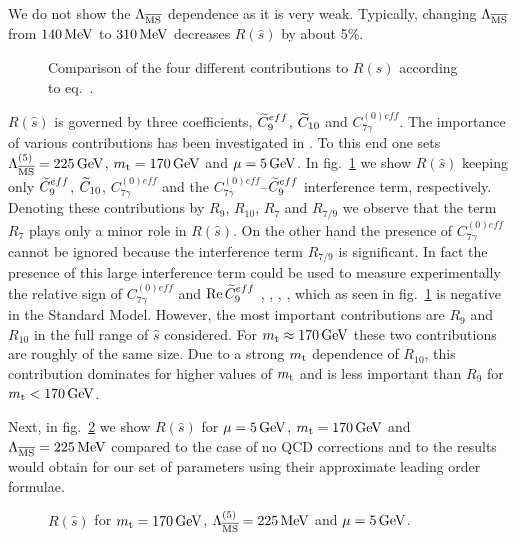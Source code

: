 We do not show the $\Lambda_{\overline{\rm MS}}$ dependence as it is very weak. Typically,
changing $\Lambda_{\overline{\rm MS}}$ from $140\, {\rm MeV}$ to $310\, {\rm MeV}$ decreases $R(\hat s)$ by
about 5\%.

\begin{figure}[hbt]
\vspace{0.10in}
\centerline{
\epsfysize=4in
}
\vspace{0.08in}
\caption[]{
Comparison of the four different contributions to $R(\hat{s})$ according
to eq.\ .
\label{fig:bsee:rscmp}}
\end{figure}

$R(\hat s)$ is governed by three coefficients, $\widetilde C_9^{eff}$,
$\widetilde C_{10}$ and $C_{7\gamma}^{(0)eff}$.  The importance of various
contributions has been investigated in \cite{burasmuenz:95}. To this
end one sets $\Lambda_{\overline{\rm MS}}^{(5)}=225\, {\rm GeV}$, $m_{\rm t}=170\, {\rm GeV}$ and $\mu = 5 \, {\rm GeV}$. In
fig.\ \ref{fig:bsee:rscmp} we show $R(\hat s)$ keeping only
$\widetilde C_9^{eff}$, $\widetilde C_{10}$, $C_{7\gamma}^{(0)eff}$ and the
$C_{7\gamma}^{(0)eff}$--$\widetilde C_9^{eff}$ interference term,
respectively.  Denoting these contributions by $R_9$, $R_{10}$, $R_7$
and $R_{7/9}$ we observe that the term $R_7$ plays only a minor role in
$R(\hat s)$. On the other hand the presence of $C_{7\gamma}^{(0)eff}$
cannot be ignored because the interference term $R_{7/9}$ is
significant. In fact the presence of this large interference term could
be used to measure experimentally the relative sign of
$C_{7\gamma}^{(0)eff}$ and $\mbox{Re}\,\widetilde C_9^{eff}$
\cite{grinstein:89a}, \cite{JW:90}, \cite{AMM:91}, \cite{GIW:94},
\cite{AGM:94} which as seen in fig.\ \ref{fig:bsee:rscmp} is negative
in the Standard Model. However, the most important contributions are
$R_9$ and $R_{10}$ in the full range of $\hat s$ considered. For $m_{\rm t}
\approx 170 \, {\rm GeV}$ these two contributions are roughly of the same size.
Due to a strong $m_{\rm t}$ dependence of $R_{10}$, this contribution
dominates for higher values of $m_{\rm t}$ and is less important than $R_9$
for $m_{\rm t} < 170 \, {\rm GeV}$.

Next, in fig.\ \ref{fig:bsee:rs2} we show $R(\hat s)$ for $\mu = 5
\, {\rm GeV}$, $m_{\rm t} = 170 \, {\rm GeV}$ and $\Lambda_{\overline{\rm MS}} = 225 \, {\rm MeV}$ compared to the case of
no QCD corrections and to the results \cite{grinstein:89a} would obtain
for our set of parameters using their approximate leading order
formulae.

\begin{figure}[hbt]
\vspace{0.10in}
\centerline{
\epsfysize=4in
}
\vspace{0.08in}
\caption[]{
$R(\hat{s})$ for $m_{\rm t}=170\, {\rm GeV}$, $\Lambda_{\overline{\rm MS}}^{(5)}=225\, {\rm MeV}$ and $\mu=5\, {\rm GeV}$. 
\label{fig:bsee:rs2}}
\end{figure}

